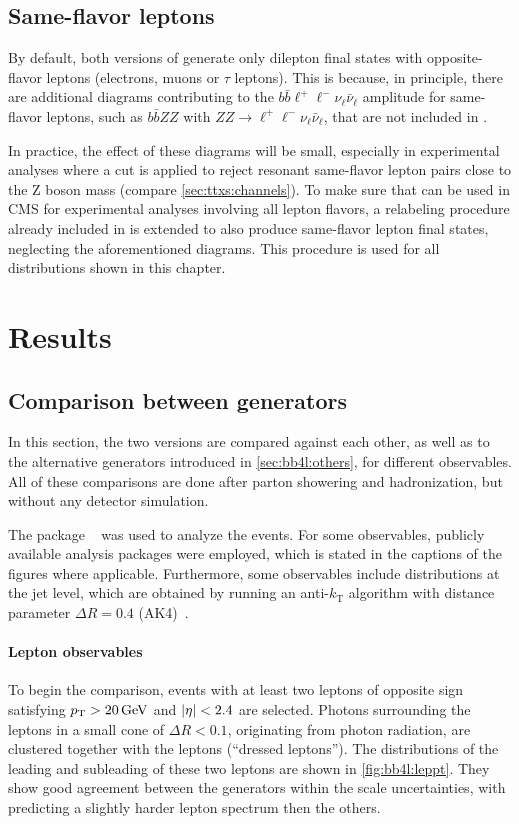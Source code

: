 \subsection{Same-flavor leptons}
\label{sec:bb4l:sameflavor}

By default, both versions of \bbfourl generate only dilepton final states with opposite-flavor leptons (electrons, muons or $\tau$ leptons). This is because, in principle, there are additional diagrams contributing to the $b \bar{b} \ell^+ \ell^- \nu_\ell \bar{\nu}_\ell$ amplitude for same-flavor leptons, such as $b \bar{b} ZZ$ with $ZZ \rightarrow \ell^+ \ell^- \nu_\ell \bar{\nu}_\ell$, that are not included in \bbfourl.

In practice, the effect of these diagrams will be small, especially in experimental analyses where a cut is applied to reject resonant same-flavor lepton pairs close to the Z boson mass (compare \cref{sec:ttxs:channels}). To make sure that \bbfourl can be used in CMS for experimental analyses involving all lepton flavors, a relabeling procedure already included in \bbfourl is extended to also produce same-flavor lepton final states, neglecting the aforementioned diagrams. This procedure is used for all \bbfourl distributions shown in this chapter.

\section{Results}

\subsection{Comparison between generators}

In this section, the two \bbfourl versions are compared against each other, as well as to the alternative generators introduced in \cref{sec:bb4l:others}, for different observables. All of these comparisons are done after parton showering and hadronization, but without any detector simulation.

The package \rivet~\cite{Rivet:2019rhm} was used to analyze the events. For some observables, publicly available analysis packages were employed, which is stated in the captions of the figures where applicable. Furthermore, some observables include distributions at the jet level, which are obtained by running an anti-$k_\mathrm{T}$ algorithm with distance parameter $\Delta R = 0.4$ (AK4)~\cite{Cacciari:2008gp}.

\paragraph{Lepton observables} To begin the comparison, events with at least two leptons of opposite sign satisfying $\pt > \SI{20}{\GeV}$ and $|\eta| < 2.4$ are selected. Photons surrounding the leptons in a small cone of $\Delta R < 0.1$, originating from photon radiation, are clustered together with the leptons (``dressed leptons''). The \pt distributions of the leading and subleading of these two leptons are shown in \cref{fig:bb4l:leppt}. They show good agreement between the generators within the scale uncertainties, with \tttWsum predicting a slightly harder lepton spectrum then the others.

